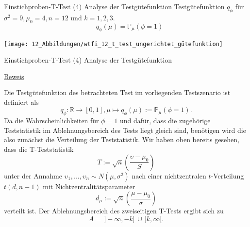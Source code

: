 \documentclass[
  8pt,
  ignorenonframetext,
]{beamer}
\newcommand{\ups} {\upsilon}
\begin{document}
\begin{frame}{Einstichproben-T-Test \textbar{} (4) Analyse der
Testgütefunktion}
\protect\hypertarget{einstichproben-t-test-4-analyse-der-testguxfctefunktion-1}{}
\center Testgütefunktion \(q_\phi\) für
\(\sigma^2 = 9, \mu_0 = 4, n = 12\) und \(k = 1,2,3\). \vspace{2mm}
\begin{equation*}
\quad q_{\phi}(\mu) = \mathbb{P}_\mu(\phi = 1)
\end{equation*}

\begin{center}\texttt{[image: 12\_Abbildungen/wtfi\_12\_t\_test\_ungerichtet\_gütefunktion]} \end{center}
\end{frame}

\begin{frame}{Einstichproben-T-Test \textbar{} (4) Analyse der
Testgütefunktion}
\protect\hypertarget{einstichproben-t-test-4-analyse-der-testguxfctefunktion-2}{}

\footnotesize

\underline{Beweis}

Die Testgütefunktion des betrachteten Test im vorliegenden Testszenario
ist definiert als \begin{equation}
q_{\phi} : \mathbb{R} \to [0,1],
\mu \mapsto q_{\phi}(\mu) := \mathbb{P}_{\mu}(\phi = 1).
\end{equation} Da die Wahrscheinlichkeiten für \(\phi = 1\) und dafür,
dass die zugehörige Teststatistik im Ablehnungsbereich des Tests liegt
gleich sind, benötigen wird die also zunächst die Verteilung der
Teststatistik. Wir haben oben bereits gesehen, dass die T-Teststatistik
\begin{equation}
T := \sqrt{n}\left(\frac{\bar{\ups} - \mu_0}{S} \right)
\end{equation} unter der Annahme
\(\ups_1,...,\ups_n \sim N(\mu,\sigma^2)\) nach einer nichtzentralen
\(t\)-Verteilung \(t(d,n-1)\) mit Nichtzentralitätsparameter
\begin{equation}
d_\mu := \sqrt{n}\left(\frac{\mu - \mu_0}{\sigma}\right)
\end{equation} verteilt ist. Der Ablehnungsbereich des zweiseitigen
T-Tests ergibt sich zu \begin{equation}
A  = \,]-\infty, -k]\, \cup \,]k,\infty[.
\end{equation} \vfill
\end{frame}
\end{document}

